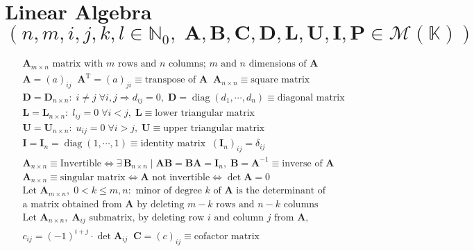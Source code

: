 \section*{Linear Algebra {\normalfont\scriptsize $(n,m,i,j,k,l\!\in\!\mathbb{N}_0,\;\mathbf{A},\mathbf{B},\mathbf{C},\mathbf{D},\mathbf{L},\mathbf{U},\mathbf{I},\mathbf{P}\!\in\!\mathcal{M}(\mathbb{K}))$}}
\underline{}\normalfont\scriptsize{}
\begin{align*}
&\mathbf{A}_{m\times n}\text{ matrix with $m$ rows and $n$ columns; $m$ and $n$ dimensions of $\mathbf{A}$} \\
&\mathbf{A}\!=\!(a)_{ij}\;\; \mathbf{A}^{\operatorname{T}}\!=\!(a)_{ji}\!\equiv\!\text{transpose of $\mathbf{A}$}\;\; \mathbf{A}_{n\times n}\!\equiv\!\text{square matrix} \\
&\mathbf{D}\!=\!\mathbf{D}_{n\times n}:\; i\!\neq\!j\;\forall i,j\Rightarrow d_{ij}\!=\!0,\;\mathbf{D}\!=\!\operatorname{diag}(d_1,\cdots,d_n)\!\equiv\!\text{diagonal matrix} \\
&\mathbf{L}\!=\!\mathbf{L}_{n\times n}:\; l_{ij}\!=\!0\;\forall i\!<\!j,\;\mathbf{L}\!\equiv\!\text{lower triangular matrix} \\
&\mathbf{U}\!=\!\mathbf{U}_{n\times n}:\; u_{ij}\!=\!0\;\forall i\!>\!j,\;\mathbf{U}\!\equiv\!\text{upper triangular matrix} \\
&\mathbf{I}\!=\!\mathbf{I}_n\!=\!\operatorname{diag}(1,\cdots,1)\!\equiv\!\text{identity matrix}\;\;(\mathbf{I}_n)_{ij}\!=\!\delta_{ij} \\
&\mathbf{A}_{n\times n}\!\equiv\!\text{Invertible}\Leftrightarrow\exists\,\mathbf{B}_{n\times n}\;|\;\mathbf{AB}\!=\!\mathbf{BA}\!=\!\mathbf{I}_n,\;\mathbf{B}\!=\!\mathbf{A}^{-1}\!\equiv\!\text{inverse of $\mathbf{A}$} \\
&\mathbf{A}_{n\times n}\!\equiv\!\text{singular matrix}\Leftrightarrow\mathbf{A}\text{ not invertible}\Leftrightarrow\det\mathbf{A}\!=\!0 \\
&\text{Let }\mathbf{A}_{m\times n},\;0\!<\!k\!\leq\!m,n:\text{ minor of degree $k$ of $\mathbf{A}$ is the determinant of} \\
&\text{a matrix obtained from $\mathbf{A}$ by deleting $m\!-\!k$ rows and $n\!-\!k$ columns} \\
&\text{Let }\mathbf{A}_{n\times n},\;\mathbf{A}_{ij}\text{ submatrix, by deleting row $i$ and column $j$ from $\mathbf{A}$,} \\
&c_{ij}\!=\!(-1)^{i+j}\!\cdot\!\det\mathbf{A}_{ij}\;\;\mathbf{C}\!=\!(c)_{ij}\!\equiv\!\text{cofactor matrix} \\

\end{align*}

